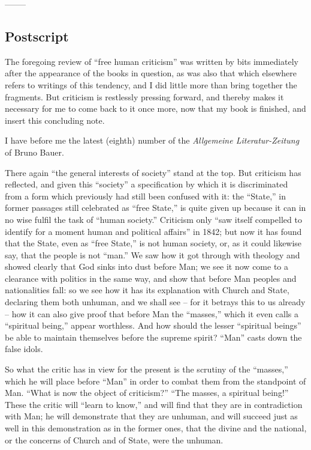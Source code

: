 \documentclass[12pt,a4paper]{book}
\begin{document}
\begin{center}
--------\end{center}


\subsection[Postscript]{\centering Postscript}

The foregoing review of ``free human criticism'' was written by bits 
immediately after the appearance of the books in question, as was also that 
which elsewhere refers to writings of this tendency, and I did little more 
than bring together the fragments. But criticism is restlessly pressing 
forward, and thereby makes it necessary for me to come back to it once more, 
now that my book is finished, and insert this concluding note.

I have before me the latest (eighth) number of the \textit{Allgemeine 
Literatur-Zeitung} of Bruno Bauer.

There again ``the general interests of society'' stand at the top. But 
criticism has reflected, and given this ``society'' a specification by which 
it is discriminated from a form which previously had still been confused with 
it: the ``State,'' in former passages still celebrated as ``free State,'' 
is quite given up because it can in no wise fulfil the task of ``human 
society.'' Criticism only ``saw itself compelled to identify for a moment 
human and political affairs'' in 1842; but now it has found that the State, 
even as ``free State,'' is not human society, or, as it could likewise say, 
that the people is not ``man.'' We saw how it got through with theology and 
showed clearly that God sinks into dust before Man; we see it now come to a 
clearance with politics in the same way, and show that before Man peoples and 
nationalities fall: so we see how it has its explanation with Church and 
State, declaring them both unhuman, and we shall see -- for it betrays this to 
us already -- how it can also give proof that before Man the ``masses,'' 
which it even calls a ``spiritual being,'' appear worthless. And how should 
the lesser ``spiritual beings'' be able to maintain themselves before the 
supreme spirit? ``Man'' casts down the false idols.

So what the critic has in view for the present is the scrutiny of the 
``masses,'' which he will place before ``Man'' in order to combat them 
from the standpoint of Man. ``What is now the object of criticism?'' ``The 
masses, a spiritual being!'' These the critic will ``learn to know,'' and 
will find that they are in contradiction with Man; he will demonstrate that 
they are unhuman, and will succeed just as well in this demonstration as in 
the former ones, that the divine and the national, or the concerns of Church 
and of State, were the unhuman.
\end{document}

